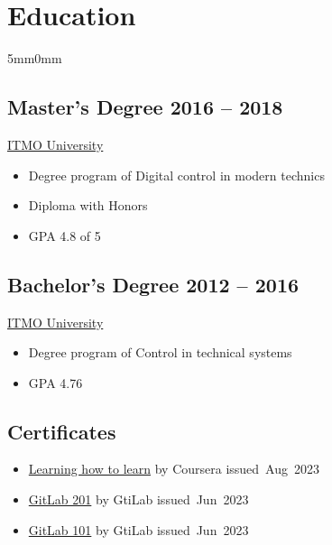 \documentclass[10pt]{article}
\newcommand{\lmvalue}{5mm}
\newcommand{\rmvalue}{0mm}
\begin{document}
    \section*{Education}
    \begin{changemargin}{\lmvalue}{\rmvalue}

        \begin{minipage}[t]{0.52\linewidth}
            \subsection*{Master's Degree \hfill {\color{gray}2016 – 2018}}
            \href{https://en.itmo.ru/}{ITMO University}
            \begin{itemize}
                \item Degree program of Digital control in modern technics
                \item Diploma with Honors
                \item GPA 4.8 of 5
            \end{itemize}
        \end{minipage}
        \hfill%
        \begin{minipage}[t]{0.42\linewidth}
            \subsection*{Bachelor's Degree \hfill {\color{gray}2012 – 2016}}
            \href{https://en.itmo.ru/}{ITMO University}
            \begin{itemize}
                \item Degree program of Control in technical systems
                \item GPA 4.76
            \end{itemize}
        \end{minipage}
      	\subsection*{Certificates}
       	\begin{itemize}
       		\item \href{https://www.coursera.org/account/accomplishments/certificate/JTS4UC77RMRH}{Learning how to learn} by Coursera {\color{gray}issued~Aug~2023}
       		\item \href{https://levelup.gitlab.com/c/rFApBMcWT66ZF-F4IPdlrQ}{GitLab 201} by GtiLab {\color{gray}issued~Jun~2023}
       		\item \href{https://levelup.gitlab.com/c/OQPvtAh7ScyFaSX04Cya0g}{GitLab 101} by GtiLab {\color{gray}issued~Jun~2023}
       	\end{itemize}
    \end{changemargin}
\end{document}
